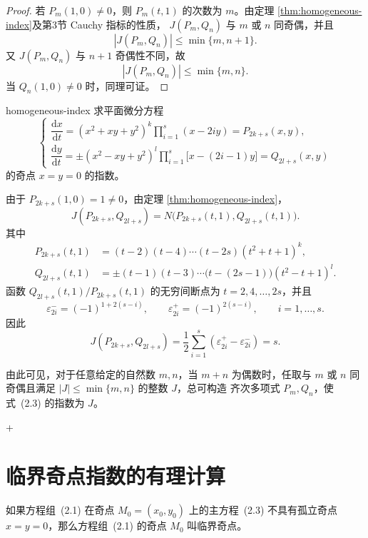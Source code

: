 \begin{proof}
若 $P_m(1,0)\ne0$，则 $P_m(t,1)$ 的次数为 $m$。由定理
\ref{thm:homogeneous-index}及第3节 Cauchy 指标的性质，
$J(P_m,Q_n)$ 与 $m$ 或 $n$ 同奇偶，并且
\[
\left|J(P_m,Q_n)\right|\leq\min\{m,n+1\}.
\]
又 $J(P_m,Q_n)$ 与 $n+1$ 奇偶性不同，故
\[
\left|J(P_m,Q_n)\right|\leq\min\{m,n\}.
\]
当 $Q_n(1,0)\ne0$ 时，同理可证。
\end{proof}

\begin{example}{}{homogeneous-index}
求平面微分方程
\[
\begin{cases}
\dfrac{\mathrm{d}x}{\mathrm{d}t}
=(x^2+xy+y^2)^k\displaystyle\prod_{i=1}^{s}(x-2iy)
=P_{2k+s}(x,y),\\[6pt]
\dfrac{\mathrm{d}y}{\mathrm{d}t}
=\pm(x^2-xy+y^2)^l\displaystyle\prod_{i=1}^{s}
\bigl[x-(2i-1)y\bigr]
=Q_{2l+s}(x,y)
\end{cases}
\]
的奇点 $x=y=0$ 的指数。
\end{example}

\begin{solution}
由于 $P_{2k+s}(1,0)=1\ne0$，由定理
\ref{thm:homogeneous-index}，
\[
J(P_{2k+s},Q_{2l+s})
=N\bigl(P_{2k+s}(t,1),Q_{2l+s}(t,1)\bigr).
\]
其中
\[
\begin{aligned}
P_{2k+s}(t,1)
&=(t-2)(t-4)\cdots(t-2s)(t^2+t+1)^k,\\
Q_{2l+s}(t,1)
&=\pm(t-1)(t-3)\cdots\bigl(t-(2s-1)\bigr)(t^2-t+1)^l.
\end{aligned}
\]
函数 $Q_{2l+s}(t,1)/P_{2k+s}(t,1)$ 的无穷间断点为
$t=2,4,\ldots,2s$，并且
\[
\varepsilon_{2i}^{-}=(-1)^{1+2(s-i)},\qquad
\varepsilon_{2i}^{+}=(-1)^{2(s-i)},\qquad i=1,\ldots,s.
\]
因此
\[
J(P_{2k+s},Q_{2l+s})
=\dfrac{1}{2}\sum_{i=1}^{s}
\left(\varepsilon_{2i}^{+}-\varepsilon_{2i}^{-}\right)=s.
\]
\end{solution}

由此可见，对于任意给定的自然数 $m,n$，当 $m+n$ 为偶数时，任取与
$m$ 或 $n$ 同奇偶且满足 $|J|\leq\min\{m,n\}$ 的整数 $J$，总可构造
齐次多项式 $P_m,Q_n$，使式~(2.3) 的指数为 $J$。

+\section{临界奇点指数的有理计算}

如果方程组~(2.1) 在奇点 $M_0=(x_0,y_0)$ 上的主方程~(2.3) 不具有孤立奇点
$x=y=0$，那么方程组~(2.1) 的奇点 $M_0$ 叫临界奇点。

